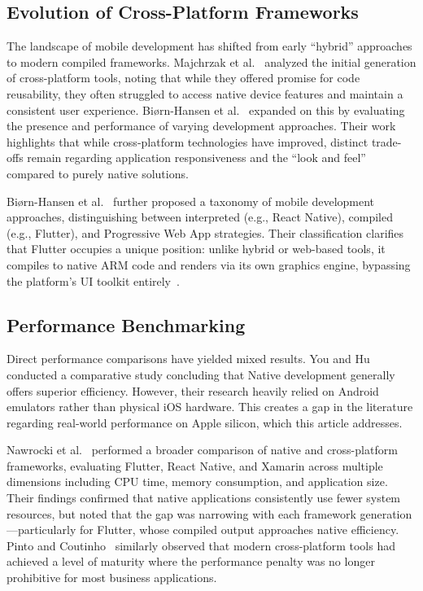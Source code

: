 \documentclass[journal]{IEEEtran}
\begin{document}
\subsection{Evolution of Cross-Platform Frameworks}
The landscape of mobile development has shifted from early ``hybrid'' approaches to modern compiled
frameworks. Majchrzak et al.~\cite{majchrzak2017} analyzed the initial generation of cross-platform tools,
noting that while they offered promise for code reusability, they often struggled to access native device
features and maintain a consistent user experience. Bi\o rn-Hansen et al.~\cite{bjornhansen2020} expanded
on this by evaluating the presence and performance of varying development approaches. Their work
highlights that while cross-platform technologies have improved, distinct trade-offs remain regarding
application responsiveness and the ``look and feel'' compared to purely native solutions.

Bi\o rn-Hansen et al.~\cite{bjornhansen2018} further proposed a taxonomy of mobile development approaches, distinguishing between interpreted (e.g., React Native), compiled (e.g., Flutter), and Progressive Web App strategies. Their classification clarifies that Flutter occupies a unique position: unlike hybrid or web-based tools, it compiles to native ARM code and renders via its own graphics engine, bypassing the platform's UI toolkit entirely~\cite{flutter2024}.

\subsection{Performance Benchmarking}
Direct performance comparisons have yielded mixed results. You and Hu~\cite{you2021} conducted a
comparative study concluding that Native development generally offers superior efficiency. However, their
research heavily relied on Android emulators rather than physical iOS hardware. This creates a gap in the
literature regarding real-world performance on Apple silicon, which this article addresses.

Nawrocki et al.~\cite{nawrocki2021} performed a broader comparison of native and cross-platform frameworks, evaluating Flutter, React Native, and Xamarin across multiple dimensions including CPU time, memory consumption, and application size. Their findings confirmed that native applications consistently use fewer system resources, but noted that the gap was narrowing with each framework generation---particularly for Flutter, whose compiled output approaches native efficiency. Pinto and Coutinho~\cite{pinto2021} similarly observed that modern cross-platform tools had achieved a level of maturity where the performance penalty was no longer prohibitive for most business applications.
\end{document}
